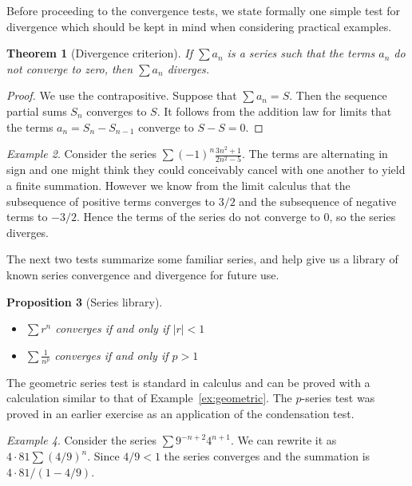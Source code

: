 \documentclass[11pt,oneside]{amsbook}
\theoremstyle{definition}
\theoremstyle{plain}
\newtheorem{theorem}{Theorem}[section]
\newtheorem{proposition}[theorem]{Proposition}
\theoremstyle{definition}
\theoremstyle{remark}
\newtheorem{example}[theorem]{Example}
\numberwithin{equation}{section}
\numberwithin{figure}{section}
\begin{document}
Before proceeding to the convergence tests, we state formally one simple test for divergence which should be kept in mind when considering practical examples.

\begin{theorem}[Divergence criterion]
  If $\sum a_n$ is a series such that the terms $a_n$ do not converge to zero, then $\sum a_n$ diverges.
\end{theorem}

\begin{proof}
  We use the contrapositive. Suppose that $\sum a_n=S$. Then the sequence partial sums $S_n$ converges to $S$. It follows from the addition law for limits that the terms $a_n=S_n-S_{n-1}$ converge to $S-S=0$.
\end{proof}

\begin{example}
  Consider the series $\sum(-1)^n\frac{3n^2+1}{2n^2-5}$. The terms are alternating in sign and one might think they could conceivably cancel with one another to yield a finite summation. However we know from the limit calculus that the subsequence of positive terms converges to $3/2$ and the subsequence of negative terms to $-3/2$. Hence the terms of the series do not converge to $0$, so the series diverges.
\end{example}

The next two tests summarize some familiar series, and help give us a library of known series convergence and divergence for future use.

\begin{proposition}[Series library]
  \begin{itemize}
    \item $\sum r^n$ converges if and only if $|r|<1$
    \item $\sum\frac{1}{n^p}$ converges if and only if $p>1$
  \end{itemize}
\end{proposition}

The geometric series test is standard in calculus and can be proved with a calculation similar to that of Example~\ref{ex:geometric}. The $p$-series test was proved in an earlier exercise as an application of the condensation test.

\begin{example}
  Consider the series $\sum 9^{-n+2}4^{n+1}$. We can rewrite it as $4\cdot81\sum(4/9)^n$. Since $4/9<1$ the series converges and the summation is $4\cdot81/(1-4/9)$.
\end{example}
\end{document}
